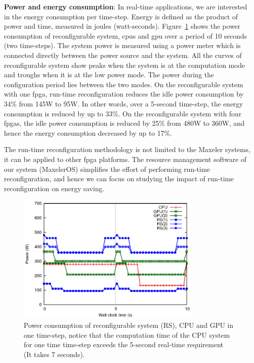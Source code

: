 \textbf{Power and energy consumption}: In real-time applications, we are interested in the energy consumption per time-step.
Energy is defined as the product of power and time, measured in joules (watt-seconds).
Figure~\ref{fig:power} shows the power consumption of reconfigurable system, \glspl{cpu} and \gls{gpu} over a period of 10 seconds (two time-steps).
The system power is measured using a power meter which is connected directly between the power source and the system.
All the curves of reconfigurable system show peaks when the system is at the computation mode and troughs when it is at the low power mode.
The power during the configuration period lies between the two modes.
On the reconfigurable system with one \gls{fpga}, run-time reconfiguration reduces the idle power consumption by 34\% from 145W to 95W.
In other words, over a 5-second time-step, the energy consumption is reduced by up to 33\%.
On the reconfigurable system with four \glspl{fpga}, the idle power consumption is reduced by 25\% from 480W to 360W, and hence the energy consumption decreased by up to 17\%.

The run-time reconfiguration methodology is not limited to the Maxeler systems, it can be applied to other \gls{fpga} platforms.
The resource management software of our system (MaxelerOS) simplifies the effort of performing run-time reconfiguration, and hence we can focus on studying the impact of run-time reconfiguration on energy saving.

\begin{figure}[t!]
\centering
\includegraphics[width=0.8\textwidth]{4_adaptation/figures/fig_power2}
\caption[Power consumption of reconfigurable system (RS), CPU and GPU in one time-step, notice that the computation time of the CPU system exceeds the 5-second real-time requirement]{Power consumption of reconfigurable system (RS), CPU and GPU in one time-step, notice that the computation time of the CPU system for one time time-step exceeds the 5-second real-time requirement (It takes 7 seconds).}
\label{fig:power}
\end{figure}

